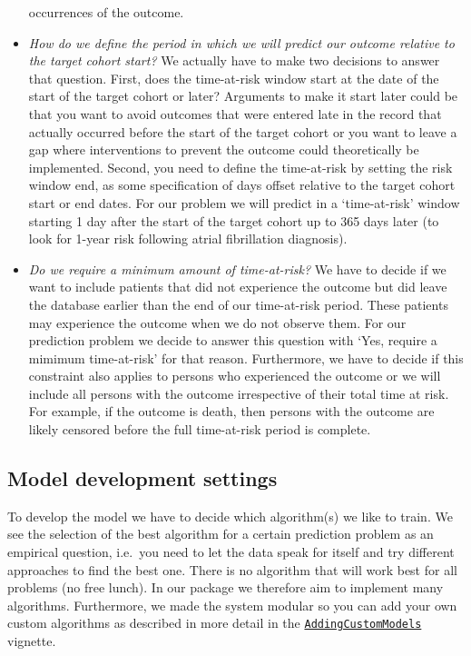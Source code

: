 \documentclass[
]{article}
\begin{document}
\begin{itemize}
  occurrences of the outcome.
\item
  \emph{How do we define the period in which we will predict our outcome
  relative to the target cohort start?} We actually have to make two
  decisions to answer that question. First, does the time-at-risk window
  start at the date of the start of the target cohort or later?
  Arguments to make it start later could be that you want to avoid
  outcomes that were entered late in the record that actually occurred
  before the start of the target cohort or you want to leave a gap where
  interventions to prevent the outcome could theoretically be
  implemented. Second, you need to define the time-at-risk by setting
  the risk window end, as some specification of days offset relative to
  the target cohort start or end dates. For our problem we will predict
  in a `time-at-risk' window starting 1 day after the start of the
  target cohort up to 365 days later (to look for 1-year risk following
  atrial fibrillation diagnosis).
\item
  \emph{Do we require a minimum amount of time-at-risk?} We have to
  decide if we want to include patients that did not experience the
  outcome but did leave the database earlier than the end of our
  time-at-risk period. These patients may experience the outcome when we
  do not observe them. For our prediction problem we decide to answer
  this question with `Yes, require a mimimum time-at-risk' for that
  reason. Furthermore, we have to decide if this constraint also applies
  to persons who experienced the outcome or we will include all persons
  with the outcome irrespective of their total time at risk. For
  example, if the outcome is death, then persons with the outcome are
  likely censored before the full time-at-risk period is complete.
\end{itemize}

\hypertarget{model-development-settings}{%
\subsection{Model development
settings}\label{model-development-settings}}

To develop the model we have to decide which algorithm(s) we like to
train. We see the selection of the best algorithm for a certain
prediction problem as an empirical question, i.e.~you need to let the
data speak for itself and try different approaches to find the best one.
There is no algorithm that will work best for all problems (no free
lunch). In our package we therefore aim to implement many algorithms.
Furthermore, we made the system modular so you can add your own custom
algorithms as described in more detail in the
\href{https://github.com/OHDSI/PatientLevelPrediction/blob/master/inst/doc/AddingCustomModels.pdf}{\texttt{AddingCustomModels}}
vignette.
\end{document}
